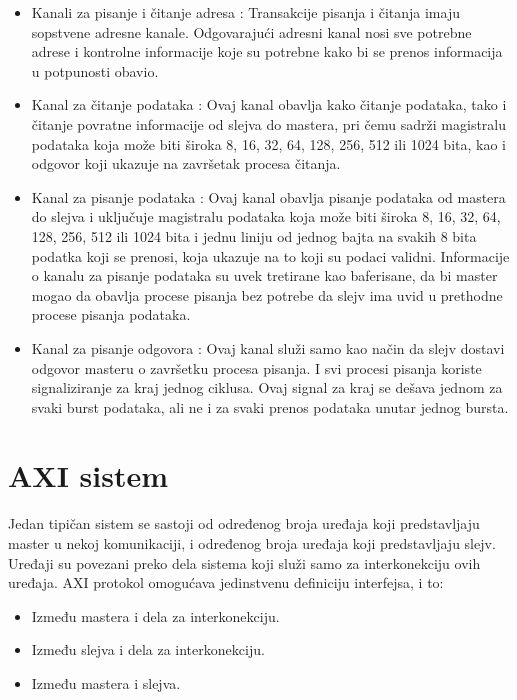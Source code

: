 \documentclass[a4paper, 12pt, diplomski]{etf}
\begin{document}
	\begin{itemize}

		\item Kanali za pisanje i čitanje adresa : Transakcije pisanja i čitanja imaju sopstvene adresne kanale. Odgovarajući adresni kanal nosi sve potrebne adrese i kontrolne informacije koje su potrebne kako bi se prenos informacija u potpunosti obavio.
		\item Kanal za čitanje podataka : Ovaj kanal obavlja kako čitanje podataka, tako i čitanje povratne informacije od slejva do mastera, pri čemu sadrži magistralu podataka koja može biti široka 8, 16, 32, 64, 128, 256, 512 ili 1024 bita, kao i odgovor koji ukazuje na završetak procesa čitanja.
		\item Kanal za pisanje podataka : Ovaj kanal obavlja pisanje podataka od mastera do slejva i uključuje magistralu podataka koja može biti široka 8, 16, 32, 64, 128, 256, 512 ili 1024 bita i jednu liniju od jednog bajta na svakih 8 bita podatka koji se prenosi, koja ukazuje na to koji su podaci validni. Informacije o kanalu za pisanje podataka su uvek tretirane kao baferisane, da bi master mogao da obavlja procese pisanja bez potrebe da slejv ima uvid u prethodne procese pisanja podataka.
		\item Kanal za pisanje odgovora : Ovaj kanal služi samo kao način da slejv dostavi odgovor masteru o završetku procesa pisanja. I svi procesi pisanja koriste signaliziranje za kraj jednog ciklusa. Ovaj signal za kraj se dešava jednom za svaki burst podataka, ali ne i za svaki prenos podataka unutar jednog bursta.

	\end{itemize}

\section{AXI sistem}

	Jedan tipičan sistem se sastoji od određenog broja uređaja koji predstavljaju master u nekoj komunikaciji, i određenog broja uređaja koji predstavljaju slejv. Uređaji su povezani preko dela sistema koji služi samo za interkonekciju ovih uređaja. AXI protokol omogućava jedinstvenu definiciju interfejsa, i to:

	\begin{itemize}

		\item Između mastera i dela za interkonekciju.
		\item Između slejva i dela za interkonekciju.
		\item Između mastera i slejva.

	\end{itemize}
\end{document}
